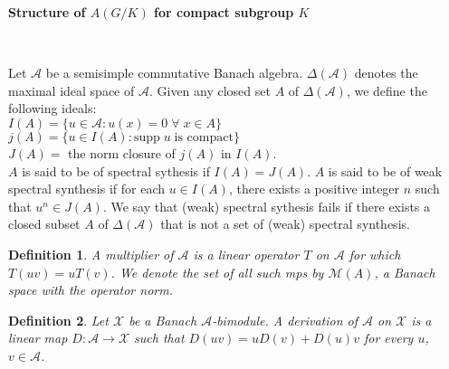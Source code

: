 \documentclass[landscape]{slides}
\newtheorem{defn}{Definition}
\begin{document}
\begin{slide}
\textbf{Structure of $A(G/K)$ for compact subgroup $K$}

\\
\begin{small}
Let $\mathcal{A}$ be a semisimple commutative Banach algebra.  $\Delta (\mathcal{A})$ denotes
the maximal ideal space of $\mathcal{A}$.  Given any closed set $A$ of $\Delta (\mathcal{A})$,
we define the following ideals:\\
$I(A) = \{u\in \mathcal{A}: u(x) = 0\;\forall\;x\in A\}$\\
$j(A) = \{u\in I(A): \text{supp}\;u\;\text{is compact} \}$\\
$J(A)=$ the norm closure of $j(A)$ in $I(A)$.\\ 
$A$ is said to be of spectral sythesis if $I(A) = J(A)$.
$A$ is said to be of weak spectral synthesis if for each $u\in I(A)$, there exists a positive integer $n$
such that $u^n \in J(A)$.  We say that (weak) spectral sythesis fails if there exists a closed subset $A$
of $\Delta(\mathcal{A})$ that is not a set of (weak) spectral synthesis.

\begin{defn}
A multiplier of $\mathcal{A}$ is a linear operator $T$ on $\mathcal{A}$ for which $T(uv) = uT(v)$.
We denote the set of all such mps by $\mathcal{M}(A)$, a Banach space with the operator norm.
\end{defn}

\begin{defn}
Let $\mathcal{X}$ be a Banach $\mathcal{A}$-bimodule.  A derivation of $\mathcal{A}$ on $\mathcal{X}$
is a linear map $D: \mathcal{A} \rightarrow \mathcal{X}$ such that $D(uv) = uD(v) + D(u)v$ for every
$u$, $v \in\mathcal{A}$.
\end{defn}

\end{small}

\end{slide}
\end{document}
